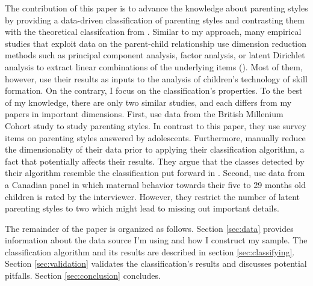 
The contribution of this paper is to advance the knowledge about parenting styles by providing a data-driven classification of parenting styles and contrasting them with the theoretical classifcation from \textcite{doepkeParentingStyleAltruism2017}. Similar to my approach, many empirical studies that exploit data on the parent-child relationship use dimension reduction methods such as principal component analysis, factor analysis, or latent Dirichlet analysis to extract linear combinations of the underlying items (\cite{ermischOriginsSocialImmobility2008, chanParentingStyleYouth2011, fioriniHowAllocationChildren2014, bonoEarlyMaternalTime2016, cobb-clarkParentingStyleInvestment2019, zumbuehlParentalInvolvementIntergenerational2020, rauhParentingTypes2020}). Most of them, however, use their results as inputs to the analysis of children's technology of skill formation. On the contrary, I focus on the classification's properties. To the best of my knowledge, there are only two similar studies, and each differs from my papers in important dimensions. First, \textcite{chanParentingStyleYouth2011} use data from the British Millenium Cohort study to study parenting styles. In contrast to this paper, they use survey items on parenting styles answered by adolescents. Furthermore, manually reduce the dimensionality of their data prior to applying their classification algorithm, a fact that potentially affects their results. They argue that the classes detected by their algorithm resemble the classification put forward in \textcite{baumrindChildCarePractices1967}. Second, \textcite{rauhParentingTypes2020} use data from a Canadian panel in which maternal behavior towards their five to 29 months old children is rated by the interviewer. However, they restrict the number of latent parenting styles to two which might lead to missing out important details.

The remainder of the paper is organized as follows. Section \ref{sec:data} provides information about the data source I'm using and how I construct my sample. The classification algorithm and its results are described in section \ref{sec:classifying}. Section \ref{sec:validation} validates the classification's results and discusses potential pitfalls. Section \ref{sec:conclusion} concludes.


